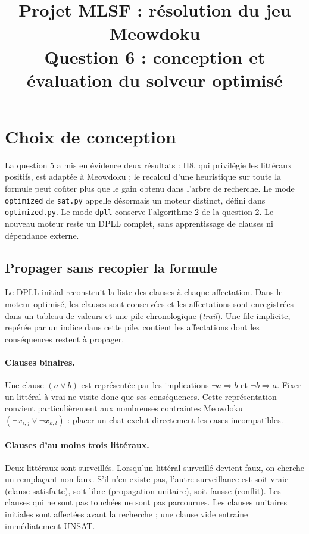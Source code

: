 \documentclass[10pt,a4paper]{article}
\title{Projet MLSF : résolution du jeu Meowdoku\\
  \large Question 6 : conception et évaluation du solveur optimisé}
\author{}
\date{}
\begin{document}
\maketitle
\vspace{-1em}

\section{Choix de conception}

La question 5 a mis en évidence deux résultats : H8, qui privilégie les
littéraux positifs, est adaptée à Meowdoku ; le recalcul d'une heuristique
sur toute la formule peut coûter plus que le gain obtenu dans l'arbre de
recherche. Le mode \texttt{optimized} de \texttt{sat.py} appelle désormais
un moteur distinct, défini dans \texttt{optimized.py}. Le mode
\texttt{dpll} conserve l'algorithme 2 de la question 2. Le nouveau moteur
reste un DPLL complet, sans apprentissage de clauses ni dépendance externe.

\subsection{Propager sans recopier la formule}

Le DPLL initial reconstruit la liste des clauses à chaque affectation.
Dans le moteur optimisé, les clauses sont conservées et les affectations
sont enregistrées dans un tableau de valeurs et une pile chronologique
(\emph{trail}). Une file implicite, repérée par un indice dans cette pile,
contient les affectations dont les conséquences restent à propager.

\paragraph{Clauses binaires.} Une clause $(a\lor b)$ est représentée par
les implications $\neg a\Rightarrow b$ et $\neg b\Rightarrow a$.
Fixer un littéral à vrai ne visite donc que ses conséquences. Cette
représentation convient particulièrement aux nombreuses contraintes
Meowdoku $(\neg x_{i,j}\lor\neg x_{k,l})$ : placer un chat exclut directement
les cases incompatibles.

\paragraph{Clauses d'au moins trois littéraux.} Deux littéraux sont
surveillés. Lorsqu'un littéral surveillé devient faux, on cherche un
remplaçant non faux. S'il n'en existe pas, l'autre surveillance est soit
vraie (clause satisfaite), soit libre (propagation unitaire), soit fausse
(conflit). Les clauses qui ne sont pas touchées ne sont pas parcourues.
Les clauses unitaires initiales sont affectées avant la recherche ; une
clause vide entraîne immédiatement UNSAT.
\end{document}
